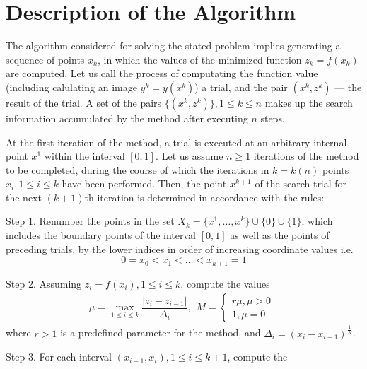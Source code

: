 \documentclass[procedia]{easychair}
\begin{document}
\section{Description of the Algorithm}
\label{sect:algorithm}

The algorithm considered for solving the stated problem implies generating
a sequence of points \(x_k\), in which the values of the minimized function \(z_k = f(x_k)\)
are computed. Let us call the process of computating the function value
(including calulating an image \(y^k=y(x^k)\)) a trial, and the pair \((x^k,z^k)\) ---
the result of the trial. A set of the pairs \(\{(x^k,z^k)\}, 1\leqslant k\leqslant n\)
makes up the search information accumulated by the method after executing \(n\) steps.
\par
At the first iteration of the method, a trial is executed at an arbitrary internal
point \(x^1\) within the interval \([0,1]\). Let us assume \(n \geqslant 1\) iterations
of the method to be completed, during the course of which the iterations in \(k = k(n)\)
points \(x_i, 1\leqslant i\leqslant k\) have been performed. Then, the point \(x^{k+1}\)
of the search trial for the next \((k+1)\)th iteration is determined in accordance with the rules:
\par
Step 1. Renumber the points in the set \(X_k=\{x^1,\dotsc,x^k\}\cup\{0\}\cup\{1\}\),
which includes the boundary points of the interval \([0,1]\) as well as the points of
preceding trials, by the lower indices in order of increasing coordinate values  i.e.
\begin{displaymath}
0=x_0<x_1<\dotsc<x_{k+1}=1
\end{displaymath}
\par
Step 2. Assuming \(z_i=f(x_i),1\leqslant i\leqslant k\), compute the values
\begin{equation}
\label{step2}
\mu=\max_{1\leqslant i\leqslant k}\dfrac{|z_i-z_{i-1}|}{\Delta_i},
\begin{matrix}
    M =
    \left\{
    \begin{matrix}
    r\mu,\mu>0 \\
    1,\mu=0
    \end{matrix} \right.
    \end{matrix}
\end{equation}
where \(r>1\) is a predefined parameter for the method, and \(\Delta_i=(x_i-x_{i-1})^\frac{1}{N}\).
\par
Step 3. For each interval \((x_{i-1},x_i),1\leqslant i\leqslant k+1\), compute the
\end{document}
